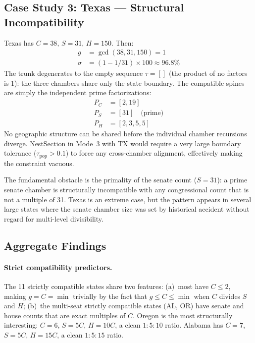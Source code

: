 \subsection{Case Study 3: Texas --- Structural Incompatibility}

Texas has $C = 38$, $S = 31$, $H = 150$.  Then:
\begin{align*}
  g &= \gcd(38, 31, 150) = 1 \\
  \sigma &= (1 - 1/31) \times 100 \approx 96.8\%
\end{align*}
The trunk degenerates to the empty sequence $\tau = []$ (the product of no
factors is 1): the three chambers share only the state boundary.  The
compatible spines are simply the independent prime factorizations:
\begin{align*}
  P_C &= [2, 19] \\
  P_S &= [31] \quad\text{(prime)} \\
  P_H &= [2, 3, 5, 5]
\end{align*}
No geographic structure can be shared before the individual chamber
recursions diverge.  NestSection in Mode~3 with TX would require a very
large boundary tolerance ($\tau_\text{pop} > 0.1$) to force any
cross-chamber alignment, effectively making the constraint vacuous.

The fundamental obstacle is the primality of the senate count ($S = 31$):
a prime senate chamber is structurally incompatible with any congressional
count that is not a multiple of 31.  Texas is an extreme case, but the
pattern appears in several large states where the senate chamber size was
set by historical accident without regard for multi-level divisibility.

\subsection{Aggregate Findings}

\paragraph{Strict compatibility predictors.}  The 11 strictly compatible
states share two features: (a)~most have $C \leq 2$, making $g = C = \min$
trivially by the fact that $g \leq C \leq \min$ when $C$ divides $S$ and $H$;
(b)~the multi-seat strictly compatible states (AL, OR) have senate and house
counts that are exact multiples of $C$.  Oregon is the most structurally
interesting: $C = 6$, $S = 5C$, $H = 10C$, a clean $1:5:10$ ratio.
Alabama has $C = 7$, $S = 5C$, $H = 15C$, a clean $1:5:15$ ratio.

